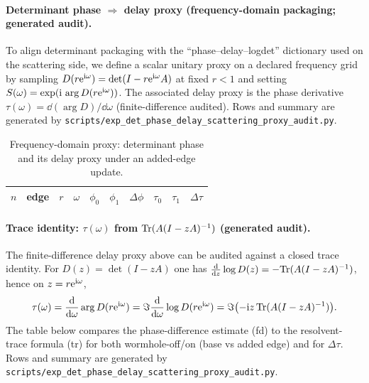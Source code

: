 %

\paragraph{Determinant phase $\Rightarrow$ delay proxy (frequency-domain packaging; generated audit).}
\AuditTag To align determinant packaging with the ``phase--delay--logdet'' dictionary used on the scattering side,
we define a scalar unitary proxy on a declared frequency grid by sampling $D(r\mathrm{e}^{\mathrm{i}\omega})=\det(I-r\mathrm{e}^{\mathrm{i}\omega}A)$ at fixed $r<1$ and setting
$S(\omega)=\exp(\mathrm{i}\,\arg D(r\mathrm{e}^{\mathrm{i}\omega}))$.
The associated delay proxy is the phase derivative $\tau(\omega)=\dd(\arg D)/\dd\omega$ (finite-difference audited).
Rows and summary are generated by \texttt{scripts/exp\_det\_phase\_delay\_scattering\_proxy\_audit.py}.

\begin{table}[t]
\centering
\scriptsize
\setlength{\tabcolsep}{6pt}
\renewcommand{\arraystretch}{1.15}
\begin{tabular}{r r r r r r r r r r}
\toprule
$n$ & edge & $r$ & $\omega$ & $\phi_0$ & $\phi_1$ & $\Delta\phi$ & $\tau_0$ & $\tau_1$ & $\Delta\tau$ \\
\midrule

\end{tabular}
\caption{Frequency-domain proxy: determinant phase and its delay proxy under an added-edge update.}
\label{tab:det_phase_delay_proxy_audit}
\end{table}

%

\paragraph{Trace identity: $\tau(\omega)$ from $\mathrm{Tr}(A(I-zA)^{-1})$ (generated audit).}
\AuditTag The finite-difference delay proxy above can be audited against a closed trace identity.
For $D(z)=\det(I-zA)$ one has $\frac{\mathrm{d}}{\mathrm{d} z}\log D(z)=-\mathrm{Tr}(A(I-zA)^{-1})$, hence on $z=r\mathrm{e}^{\mathrm{i}\omega}$,
\[
\tau(\omega)=\frac{\mathrm{d}}{\mathrm{d}\omega}\arg D(r\mathrm{e}^{\mathrm{i}\omega})
=\Im\frac{\mathrm{d}}{\mathrm{d}\omega}\log D(r\mathrm{e}^{\mathrm{i}\omega})
=\Im\bigl(-\mathrm{i} z\,\mathrm{Tr}(A(I-zA)^{-1})\bigr).
\]
The table below compares the phase-difference estimate (fd) to the resolvent-trace formula (tr) for both wormhole-off/on (base vs added edge) and for $\Delta\tau$.
Rows and summary are generated by \texttt{scripts/exp\_det\_phase\_delay\_scattering\_proxy\_audit.py}.

